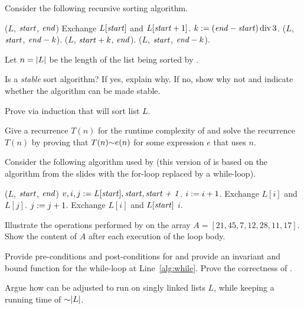 \begin{problem}
Consider the following recursive sorting algorithm.
\begin{myalgo}{($L$, $\textit{start\/}$, $\textit{end\/}$)}
            \STATE Exchange $L[\textit{start\/}]$ and $L[\textit{start\/} + 1]$.
        \ENDIF
        \STATE $k := (\textit{end\/} - \textit{start\/}) \operatorname{div} 3$.
        \STATE {}($L$, $\textit{start\/}$, $\textit{end\/} - k$).
        \STATE {}($L$, $\textit{start\/} + k$, $\textit{end\/}$).
        \STATE {}($L$, $\textit{start\/}$, $\textit{end\/} - k$).
    \ENDIF
\end{myalgo}
Let $n = \lvert L \rvert$ be the length of the list being sorted by .

\begin{questions}
\item Is  a \emph{stable} sort algorithm? If yes, explain why. If no, show why not and indicate whether the algorithm can be made stable.
\item Prove via induction that  will sort list $L$.
\item Give a recurrence $T(n)$ for the runtime complexity of  and solve the recurrence $T(n)$ by proving that $T(n) \mathord{\sim}e(n)$ for some expression $e$ that uses $n$.
\end{questions}
\end{problem}

\begin{problem}
Consider the following  algorithm used by  (this version of  is based on the algorithm from the slides with the for-loop replaced by a while-loop).
\begin{myalgo}{($L$, $\textit{start\/}$, $\textit{end\/}$)}
    \STATE $v, i, j := L[\textit{start\/}], \textit{start\/}, \textit{start + 1\/}$.
    \label{alg:while}
            \STATE $i := i + 1$.
            \STATE Exchange $L[i]$ and $L[j]$.
        \ENDIF
        \STATE $j := j + 1$.
    \ENDWHILE
    \STATE Exchange $L[i]$ and $L[\textit{start\/}]$
    \RETURN $i$.
\end{myalgo}

\begin{questions}
    \item Illustrate the operations performed by  on the array $A = [21, 45, 7, 12, 28, 11, 17]$. Show the content of $A$ after each execution of the loop body.
    \item Provide pre-conditions and post-conditions for  and provide an invariant and bound function for the while-loop at Line~\ref*{alg:while}. Prove the correctness of .
    \item Argue how  can be adjusted to run on singly linked lists $L$, while keeping a running time of $\mathord{\sim}\lvert L \rvert$.
\end{questions}
\end{problem}

